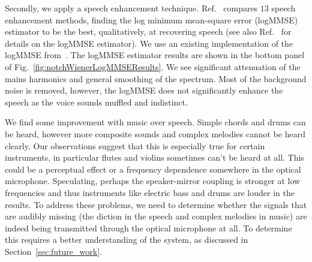 \documentclass[paper-main.tex]{subfiles}
\begin{document}
Secondly, we apply a speech enhancement technique. 
Ref.~\cite{SubjectiveComparison} compares $13$ speech enhancement methods, finding the log minimum mean-square error (logMMSE) estimator to be the best, qualitatively, at recovering speech (see also Ref.~\cite{Ephraim1984SpeechEU_logMMSE} for details on the logMMSE estimator). 
We use an existing implementation of the logMMSE from~\cite{logmmse}.  
The logMMSE estimator results are shown in the bottom panel of Fig.~\ref{fig:notchWienerLogMMSEResults}. 
We see significant attenuation of the mains harmonics and general smoothing of the spectrum. 
Most of the background noise is removed, however, the logMMSE does not significantly enhance the speech as the voice sounds muffled and indistinct.


We find some improvement with music over speech. 
Simple chords and drums can be heard, however more composite sounds and complex melodies cannot be heard clearly. 
Our observations suggest that this is especially true for certain instruments, in particular flutes and violins sometimes can’t be heard at all. 
This could be a perceptual effect or a frequency dependence somewhere in the optical microphone.
Speculating, perhaps the speaker-mirror coupling is stronger at low frequencies and thus instruments like electric bass and drums are louder in the results.
To address these problems, we need to determine whether the signals that are audibly missing (the diction in the speech and complex melodies in music) are indeed being transmitted through the optical microphone at all. 
To determine this requires a better understanding of the system, as discussed in Section~\ref{sec:future_work}.
\end{document}
